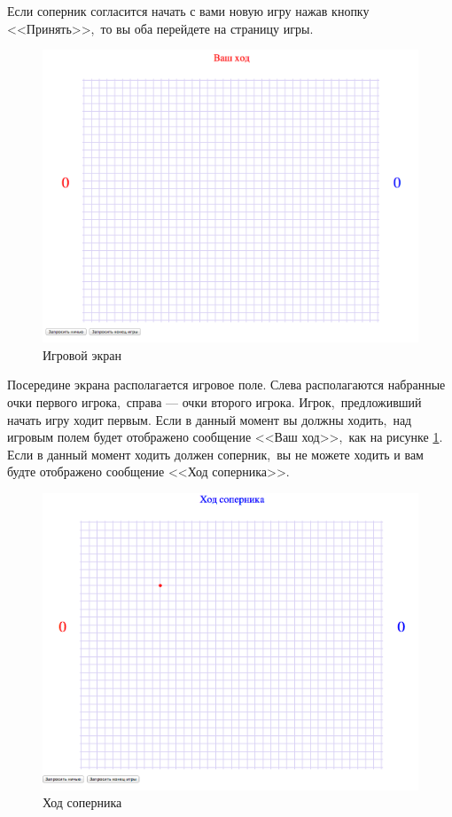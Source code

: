\documentclass[14pt,a4paper]{report}
\begin{document}
Если соперник согласится начать с вами новую игру нажав кнопку <<Принять>>,~то вы оба перейдете на страницу игры.
\begin{figure}[H]
\centerline{\includegraphics[scale=0.5]{gfx/13_game.png}}
\caption{Игровой экран}
\label{fig:game}
\end{figure}
Посередине экрана располагается игровое поле. Слева располагаются набранные очки первого игрока,~справа --- очки второго игрока. Игрок,~предложивший начать игру ходит первым. Если в данный момент вы должны ходить,~над игровым полем будет отображено сообщение <<Ваш ход>>,~как на рисунке \ref{fig:game}. Если в данный момент ходить должен соперник,~вы не можете ходить и вам будте отображено сообщение <<Ход соперника>>.
\begin{figure}[H]
\centerline{\includegraphics[scale=0.5]{gfx/14_game_other.png}}
\caption{Ход соперника}
\label{fig:game_other}
\end{figure}
\end{document}
